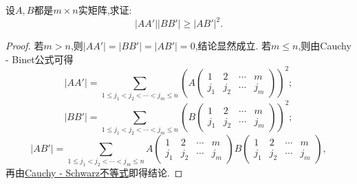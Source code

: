 \documentclass[../../main.tex]{subfiles}%
\begin{document}
\begin{example}
设\(A,B\)都是\(m\times n\)实矩阵,求证:
\[
|AA'||BB'|\geqslant |AB'|^2.
\]
\end{example}
\begin{proof}

若\(m > n\),则\(|AA'| = |BB'| = |AB'| = 0\),结论显然成立.
若\(m\leqslant  n\),则由Cauchy - Binet公式可得
\[
|AA'|=\sum_{1\leqslant  j_1<j_2<\cdots<j_m\leqslant  n}\left(A\begin{pmatrix}
1 & 2 & \cdots & m\\
j_1 & j_2 & \cdots & j_m
\end{pmatrix}\right)^2;
\]
\[
|BB'|=\sum_{1\leqslant  j_1<j_2<\cdots<j_m\leqslant  n}\left(B\begin{pmatrix}
1 & 2 & \cdots & m\\
j_1 & j_2 & \cdots & j_m
\end{pmatrix}\right)^2;
\]
\[
|AB'|=\sum_{1\leqslant  j_1<j_2<\cdots<j_m\leqslant  n}A\begin{pmatrix}
1 & 2 & \cdots & m\\
j_1 & j_2 & \cdots & j_m
\end{pmatrix}B\begin{pmatrix}
1 & 2 & \cdots & m\\
j_1 & j_2 & \cdots & j_m
\end{pmatrix},
\]
再由\hyperref[theorem:Cauchy - Schwarz不等式]{Cauchy - Schwarz不等式}即得结论.

\end{proof}
\end{document}
